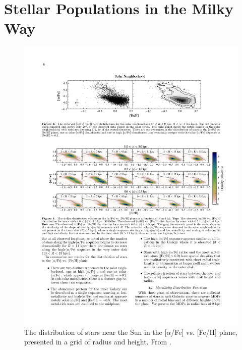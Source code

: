\section{Stellar Populations in the Milky Way}

\begin{figure}
  \centering
  \includegraphics[width=\textwidth]{Introduction/figs/hayden_15.pdf}
  \caption[Metallicity and abundance of solar cylinder stars as a
  function of radius and
  height]{\fixspacing\label{intro:fig:hayden}The distribution of stars
    near the Sun in the [$\alpha$/Fe] vs. [Fe/H] plane, presented in a
    grid of radius and height. From \citet{Hayden15}.}
\end{figure}

